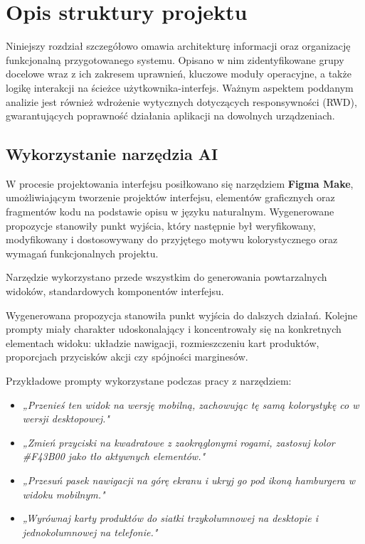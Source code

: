 \chapter{Opis struktury projektu}
Niniejszy rozdział szczegółowo omawia architekturę informacji oraz organizację funkcjonalną przygotowanego systemu. Opisano w nim zidentyfikowane grupy docelowe wraz z ich zakresem uprawnień, kluczowe moduły operacyjne, a także logikę interakcji na ścieżce użytkownika-interfejs. Ważnym aspektem poddanym analizie jest również wdrożenie wytycznych dotyczących responsywności (RWD), gwarantujących poprawność działania aplikacji na dowolnych urządzeniach.

\section{Wykorzystanie narzędzia AI}

W procesie projektowania interfejsu posiłkowano się 
narzędziem \textbf{Figma Make}, umożliwiającym tworzenie
projektów interfejsu, 
elementów graficznych oraz fragmentów kodu na podstawie 
opisu w języku naturalnym. Wygenerowane propozycje 
stanowiły punkt wyjścia, który następnie był weryfikowany, 
modyfikowany i dostosowywany do przyjętego motywu 
kolorystycznego oraz wymagań funkcjonalnych projektu.

Narzędzie wykorzystano przede wszystkim do generowania
powtarzalnych widoków, standardowych komponentów interfejsu.

Wygenerowana propozycja stanowiła punkt wyjścia do dalszych
działań. Kolejne prompty miały charakter udoskonalający
i koncentrowały się na konkretnych elementach widoku:
układzie nawigacji, rozmieszczeniu kart produktów,
proporcjach przycisków akcji czy spójności marginesów.

Przykładowe prompty wykorzystane podczas pracy z narzędziem:
\begin{itemize}
    \item \textit{„Przenieś ten widok na wersję mobilną, zachowując tę samą kolorystykę co w wersji desktopowej."}
    \item \textit{„Zmień przyciski na kwadratowe z zaokrąglonymi rogami, zastosuj kolor \#F43B00 jako tło aktywnych elementów."}
    \item \textit{„Przesuń pasek nawigacji na górę ekranu i ukryj go pod ikoną hamburgera w widoku mobilnym."}
    \item \textit{„Wyrównaj karty produktów do siatki trzykolumnowej na desktopie i jednokolumnowej na telefonie."}
\end{itemize}

